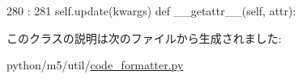 \begin{DoxyCode}
280                                     :
281             self.update(kwargs)
        def __getattr__(self, attr):
\end{DoxyCode}


このクラスの説明は次のファイルから生成されました:\begin{DoxyCompactItemize}
\item 
python/m5/util/\hyperlink{code__formatter_8py}{code\_\-formatter.py}\end{DoxyCompactItemize}
